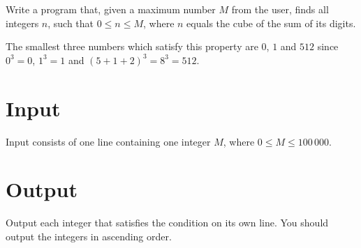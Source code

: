 
Write a program that, given a maximum number $M$ from the user,
finds all integers $n$, such that $0 \leq n \leq M$,
where $n$ equals the cube of the sum of its digits.

The smallest three numbers which satisfy this property are $0$, $1$ and $512$ since $0^3 = 0$, $1^3 = 1$ and $(5+1+2)^3 = 8^3 = 512$.

\section*{Input}
Input consists of one line containing one integer $M$, where $0 \leq M \leq 100\,000$.

\section*{Output}
Output each integer that satisfies the condition on its own line.
You should output the integers in ascending order.
